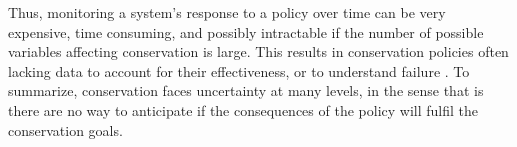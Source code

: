 \documentclass[12pt,a4paper]{article}
\begin{document}
Thus, monitoring a system's response to a policy over time can be very expensive, time consuming, and possibly intractable if the number of possible variables affecting conservation is large.
This results in conservation policies often lacking data to account for their effectiveness, or to understand failure \citep{keith2011uncertainty}.
To summarize, conservation faces uncertainty at many levels, in the sense that is there are no way to anticipate if the consequences of the policy will fulfil the conservation goals.
\end{document}
